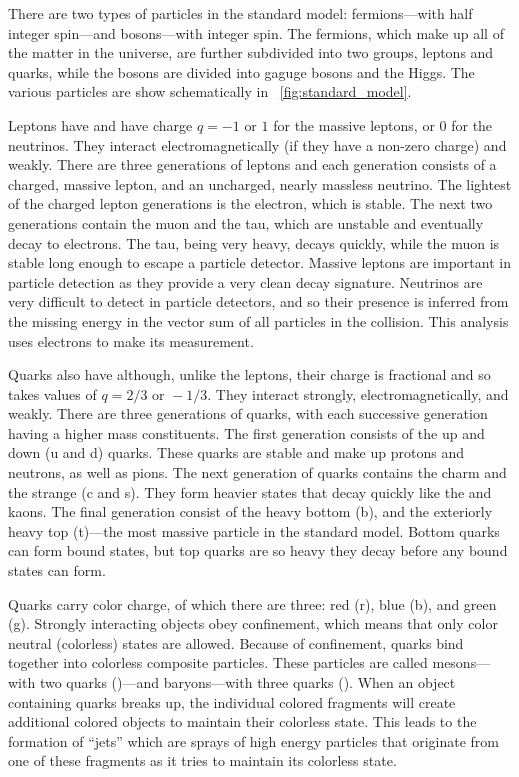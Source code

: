There are two types of particles in the standard model: fermions---with half
integer spin---and bosons---with integer spin. The fermions, which make up all
of the matter in the universe, are further subdivided into two groups, leptons
and quarks, while the bosons are divided into gaguge bosons and the Higgs.  The
various particles are show schematically in \FIG~\ref{fig:standard_model}.

Leptons have \spinhalf and have charge $q=-1 \text{ or } 1$ for the massive
leptons, or 0 for the neutrinos. They interact electromagnetically (if they
have a non-zero charge) and weakly. There are three generations of leptons and
each generation consists of a charged, massive lepton, and an uncharged, nearly
massless neutrino. The lightest of the charged lepton generations is the
electron, which is stable. The next two generations contain the muon and the
tau, which are unstable and eventually decay to electrons. The tau, being very
heavy, decays quickly, while the muon is stable long enough to escape a
particle detector. Massive leptons are important in particle detection as they
provide a very clean decay signature. Neutrinos are very difficult to detect in
particle detectors, and so their presence is inferred from the missing energy
in the vector sum of all particles in the collision. This analysis uses
electrons to make its measurement.

Quarks also have \spinhalf although, unlike the leptons, their charge is
fractional and so takes values of $q = 2/3 \text{ or } -1/3$. They interact
strongly, electromagnetically, and weakly. There are three generations of
quarks, with each successive generation having a higher mass constituents. The
first generation consists of the up and down (u and d) quarks. These quarks are
stable and make up protons and neutrons, as well as pions. The next generation
of quarks contains the charm and the strange (c and s). They form heavier
states that decay quickly like the \jpsi and kaons. The final generation
consist of the heavy bottom (b), and the exteriorly heavy top (t)---the most
massive particle in the standard model. Bottom quarks can form bound states,
but top quarks are so heavy they decay before any bound states can form.

Quarks carry color charge, of which there are three: red (r),
blue (b), and green (g). Strongly interacting objects obey confinement, which
means that only color neutral (colorless) states are allowed. Because of
confinement, quarks bind together into colorless composite particles. These
particles are called mesons---with two quarks (\qqbar)---and baryons---with
three quarks (\baryon). When an object containing quarks breaks up, the
individual colored fragments will create additional colored objects to maintain
their colorless state. This leads to the formation of ``jets'' which are sprays
of high energy particles that originate from one of these fragments as it tries
to maintain its colorless state.


